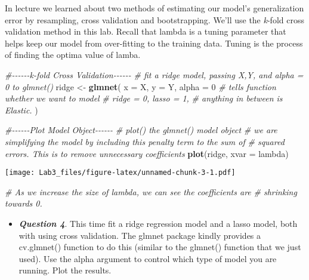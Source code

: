\documentclass[
]{article}
\newenvironment{Shaded}{\begin{snugshade}}{\end{snugshade}}
\newcommand{\AttributeTok}[1]{\textcolor[rgb]{0.13,0.29,0.53}{#1}}
\newcommand{\CommentTok}[1]{\textcolor[rgb]{0.56,0.35,0.01}{\textit{#1}}}
\newcommand{\DecValTok}[1]{\textcolor[rgb]{0.00,0.00,0.81}{#1}}
\newcommand{\FunctionTok}[1]{\textcolor[rgb]{0.13,0.29,0.53}{\textbf{#1}}}
\newcommand{\NormalTok}[1]{#1}
\newcommand{\OtherTok}[1]{\textcolor[rgb]{0.56,0.35,0.01}{#1}}
\newcommand{\StringTok}[1]{\textcolor[rgb]{0.31,0.60,0.02}{#1}}
\providecommand{\tightlist}{%
  \setlength{\itemsep}{0pt}\setlength{\parskip}{0pt}}
\begin{document}
In lecture we learned about two methods of estimating our model's
generalization error by resampling, cross validation and bootstrapping.
We'll use the \emph{k}-fold cross validation method in this lab. Recall
that lambda is a tuning parameter that helps keep our model from
over-fitting to the training data. Tuning is the process of finding the
optima value of lamba.

\begin{Shaded}
\begin{Highlighting}[]
\CommentTok{\#{-}{-}{-}{-}{-}{-}k{-}fold Cross Validation{-}{-}{-}{-}{-}{-}}
\CommentTok{\# fit a ridge model, passing X,Y, and alpha = 0 to glmnet()}
\NormalTok{ridge }\OtherTok{\textless{}{-}} \FunctionTok{glmnet}\NormalTok{(}
  \AttributeTok{x =}\NormalTok{ X,}
  \AttributeTok{y =}\NormalTok{ Y,}
  \AttributeTok{alpha =} \DecValTok{0}                   \CommentTok{\# tells function whether we want to model}
                              \CommentTok{\# ridge = 0, lasso = 1, }
                              \CommentTok{\# anything in between is Elastic.}
\NormalTok{)}


\CommentTok{\#{-}{-}{-}{-}{-}{-}Plot Model Object{-}{-}{-}{-}{-}{-}}
\CommentTok{\# plot() the glmnet() model object}
\CommentTok{\# we are simplifying the model by including this penalty term to the sum of }
\CommentTok{\# squared errors. This is to remove unnecessary coefficients}
\FunctionTok{plot}\NormalTok{(ridge,}
     \AttributeTok{xvar =} \StringTok{\textquotesingle{}lambda\textquotesingle{}}\NormalTok{)  }
\end{Highlighting}
\end{Shaded}

\texttt{[image: Lab3\_files/figure-latex/unnamed-chunk-3-1.pdf]}

\begin{Shaded}
\begin{Highlighting}[]
\CommentTok{\# As we increase the size of lambda, we can see the coefficients are }
\CommentTok{\# shrinking towards 0.}
\end{Highlighting}
\end{Shaded}

\begin{itemize}
\tightlist
\item
  \textbf{\emph{Question 4}}. This time fit a ridge regression model and
  a lasso model, both with using cross validation. The glmnet package
  kindly provides a cv.glmnet() function to do this (similar to the
  glmnet() function that we just used). Use the alpha argument to
  control which type of model you are running. Plot the results.
\end{itemize}
\end{document}
